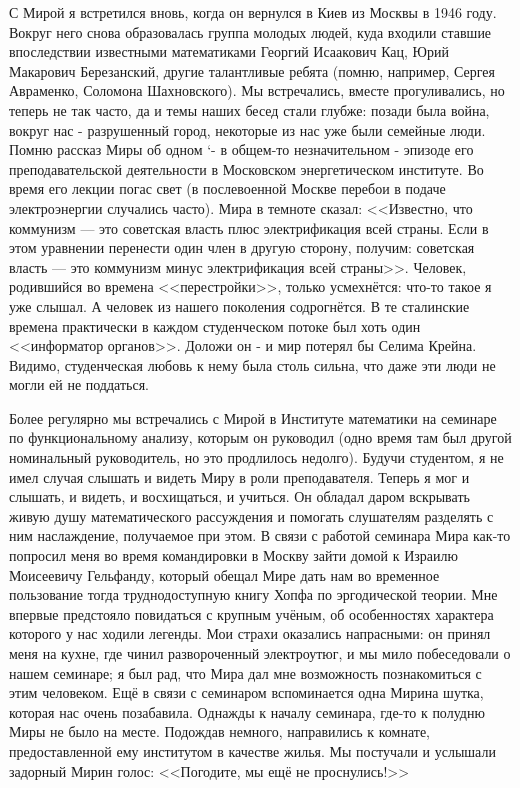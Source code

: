 С Мирой я встретился вновь, когда он вернулся в Киев из Москвы в 1946 году. Вокруг него снова образовалась группа молодых людей, куда входили ставшие впоследствии известными математиками Георгий Исаакович Кац, Юрий Макарович Березанский, другие талантливые ребята (помню, например, Сергея Авраменко, Соломона Шахновского). Мы встречались, вместе прогуливались, но теперь не так часто, да и темы наших бесед стали глубже: позади была война, вокруг нас - разрушенный город, некоторые из нас уже были семейные люди. Помню рассказ Миры об одном `- в общем-то незначительном - эпизоде его преподавательской деятельности в Московском энергетическом институте. Во время его лекции погас свет (в послевоенной Москве перебои в подаче электроэнергии случались часто). Мира в темноте сказал: <<Известно, что коммунизм --- это советская власть плюс электрификация всей страны. Если в этом уравнении перенести один член в другую сторону, получим: советская власть --- это коммунизм минус электрификация всей страны>>. Человек, родившийся во времена <<перестройки>>, только усмехнётся: что-то такое я уже слышал. А человек из нашего поколения содрогнётся. В те сталинские времена практически в каждом студенческом потоке был хоть один <<информатор органов>>. Доложи он - и мир потерял бы Селима Крейна. Видимо, студенческая любовь к нему была столь сильна, что даже эти люди не могли ей не поддаться.

Более регулярно мы встречались с Мирой в Институте математики на семинаре по функциональному анализу, которым он руководил (одно время там был другой номинальный руководитель, но это продлилось недолго). Будучи студентом, я не имел случая слышать и видеть Миру в роли преподавателя. Теперь я мог и слышать, и видеть, и восхищаться, и учиться. Он обладал даром вскрывать живую душу математического рассуждения и помогать слушателям разделять с ним наслаждение, получаемое при этом. В связи с работой семинара Мира как-то попросил меня во время командировки в Москву зайти домой к Израилю Моисеевичу Гельфанду, который обещал Мире дать нам во временное пользование тогда труднодоступную книгу Хопфа по эргодической теории. Мне впервые предстояло повидаться с крупным учёным, об особенностях характера которого у нас ходили легенды. Мои страхи оказались напрасными: он принял меня на кухне, где чинил развороченный электроутюг, и мы мило побеседовали о нашем семинаре; я был рад, что Мира дал мне возможность познакомиться с этим человеком. Ещё в связи с семинаром вспоминается одна Мирина шутка, которая нас очень позабавила. Однажды к началу семинара, где-то к полудню Миры не было на месте. Подождав немного, направились к комнате, предоставленной ему институтом в качестве жилья. Мы постучали и услышали задорный Мирин голос: <<Погодите, мы ещё не проснулись!>>

